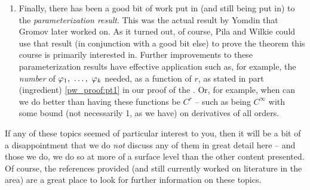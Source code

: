 \begin{remark}
\begin{enumerate}
    \item Finally, there has been a good bit of work put in (and still being put in) to the \emph{parameterization result}. This was the actual result by Yomdin that Gromov later worked on. As it turned out, of course, Pila and Wilkie could use that result (in conjunction with a good bit else) to prove the theorem this course is primarily interested in. Further improvements to these parameterization results have effective application such as, for example, the \emph{number} of $\varphi_1, \ \hdots, \ \varphi_{k}$ needed, as a function of $r$, as stated in part (ingredient) \ref{pw_proof:pt1} in our proof of the \pwt. Or, for example, when can we do better than having these functions be $C^r$ -- such as being $C^{\infty}$ with some bound (not necessarily 1, as we have) on derivatives of all orders.
  \end{enumerate}
\end{remark}

If any of these topics seemed of particular interest to you, then it will be a bit of a disappointment that we do  \emph{not} discuss any of them in great detail here -- and those we do, we do so at more of a surface level than the other content presented. Of course, the references provided (and still currently worked on literature in the area) are a great place to look for further information on these topics.
